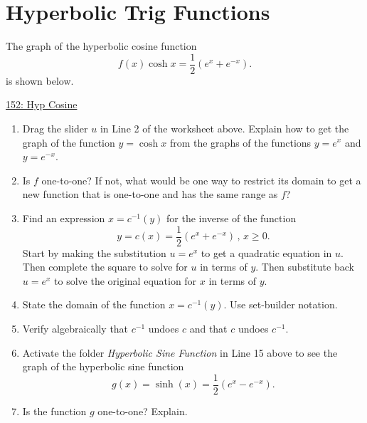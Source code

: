 \documentclass{ximera}
\begin{document}
\section{Hyperbolic Trig Functions}
\begin{question} \label{Qkdfsm13}
The graph of the hyperbolic cosine function
\[
    f(x) \cosh x= \frac{1}{2}\left( e^x + e^{-x} \right).
\]
is shown below.

\begin{onlineOnly}
    \begin{center}
\end{center}
\end{onlineOnly}

\href{https://www.desmos.com/calculator/nubdwzgsa9}{152: Hyp Cosine}

\begin{enumerate}
\item Drag the slider $u$ in Line 2 of the worksheet above. Explain how to get the graph of the function $y=\cosh x$ from the graphs of the functions $y=e^x$ and $y=e^{-x}$.

\begin{freeResponse}
\end{freeResponse}

\item Is $f$ one-to-one? If not, what would be one way to restrict its domain to get a new function that is one-to-one and has the same range as $f$?

\item Find an expression $x=c^{-1}(y)$ for the inverse of the function
\[
   y= c(x) = \frac{1}{2}\left( e^x + e^{-x} \right) \, , \, x\geq 0.
\]
Start by making the substitution $u=e^x$ to get a quadratic equation in $u$. Then complete the square to solve for $u$ in terms of $y$. Then substitute back $u=e^x$ to solve the original equation for $x$ in terms of $y$.

\item State the domain of the function $x = c^{-1}(y)$. Use set-builder notation.

\item Verify algebraically that $c^{-1}$ undoes $c$ and that $c$ undoes $c^{-1}$.


\item Activate the folder \emph{Hyperbolic Sine Function} in Line 15 above to see the graph of the hyperbolic sine function
\[
  g(x) =  \sinh(x) = \frac{1}{2}\left( e^x - e^{-x} \right).
\]

\item Is the function $g$ one-to-one? Explain.
\begin{freeResponse}
\end{freeResponse}


\end{enumerate}
\end{question}
\end{document}
